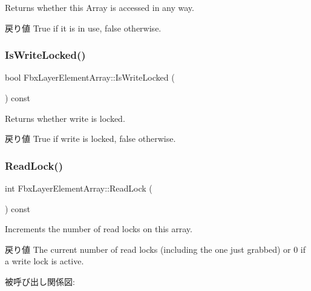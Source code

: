 Returns whether this Array is accessed in any way. \begin{DoxyReturn}{戻り値}
{\ttfamily True} if it is in use, {\ttfamily false} otherwise. 
\end{DoxyReturn}
\mbox{\label{class_fbx_layer_element_array_a16cf9a248965cbe26d932c3fb6869c85}} 
\subsubsection{\texorpdfstring{Is\+Write\+Locked()}{IsWriteLocked()}}
{\footnotesize\ttfamily bool Fbx\+Layer\+Element\+Array\+::\+Is\+Write\+Locked (\begin{DoxyParamCaption}{ }\end{DoxyParamCaption}) const}

Returns whether write is locked. \begin{DoxyReturn}{戻り値}
{\ttfamily True} if write is locked, {\ttfamily false} otherwise. 
\end{DoxyReturn}
\mbox{\label{class_fbx_layer_element_array_afb3f283bed4e92d60488f582bd58bf80}} 
\subsubsection{\texorpdfstring{Read\+Lock()}{ReadLock()}}
{\footnotesize\ttfamily int Fbx\+Layer\+Element\+Array\+::\+Read\+Lock (\begin{DoxyParamCaption}{ }\end{DoxyParamCaption}) const}

Increments the number of read locks on this array. \begin{DoxyReturn}{戻り値}
The current number of read locks (including the one just grabbed) or 0 if a write lock is active. 
\end{DoxyReturn}
被呼び出し関係図\+:
\mbox{\label{class_fbx_layer_element_array_a75a18c8aecb5dc8c68c05c02bd54d7f4}} 
